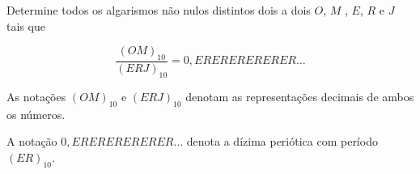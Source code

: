 Determine todos os algarismos não nulos distintos dois a dois $O$, $M$ , $E$, $R$ e $J$ tais que

\[ \frac{(OM)_{10}}{(ERJ)_{10}} = 0,ERERERERERER\dots\]

\begin{rem}
	As notações $(OM)_{10}$ e $(ERJ)_{10}$ denotam as representações decimais de ambos os números.
\end{rem}

\begin{rem}
	A notação $0,ERERERERERER\dots$ denota a dízima periótica com período $(ER)_{10}$.
\end{rem}
